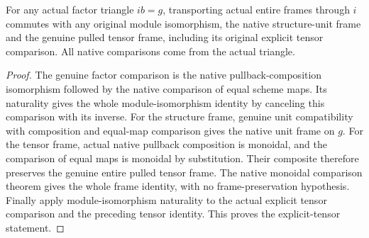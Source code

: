\begin{lemma}\label{lem:fc-actual-factor-frame-tensor-naturality}
\leanok
{}
For any actual factor triangle $ib=g$, transporting actual entire
frames through $i$ commutes with any original module isomorphism,
the native structure-unit frame and the genuine pulled tensor
frame, including its original explicit tensor comparison.
All native comparisons come from the actual triangle.
\end{lemma}
\begin{proof}
The genuine factor comparison is the native pullback-composition
isomorphism followed by the native comparison of equal scheme
maps. Its naturality gives the whole module-isomorphism identity
by canceling this comparison with its inverse. For the structure
frame, genuine unit compatibility with composition and equal-map
comparison gives the native unit frame on $g$. For the tensor
frame, actual native pullback composition is monoidal, and the
comparison of equal maps is monoidal by substitution. Their
composite therefore preserves the genuine entire pulled tensor
frame. The native monoidal comparison theorem gives the whole
frame identity, with no frame-preservation hypothesis. Finally
apply module-isomorphism naturality to the actual explicit tensor
comparison and the preceding tensor identity. This proves the
explicit-tensor statement.
\end{proof}

